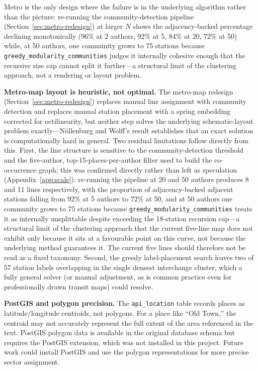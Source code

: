 \documentclass[logo,msc]{infthesis}
\begin{document}
Metro is the only design where the failure is in the underlying algorithm rather than the picture: re-running the community-detection pipeline (Section~\ref{sec:metro-redesign}) at larger $N$ shows the adjacency-backed percentage declining monotonically (96\% at 2 authors, 92\% at 5, 84\% at 20, 72\% at 50) while, at 50 authors, one community grows to 75 stations because \texttt{greedy\_modularity\_communities} judges it internally cohesive enough that the recursive size cap cannot split it further---a structural limit of the clustering approach, not a rendering or layout problem.
 
\textbf{Metro-map layout is heuristic, not optimal.} The metro-map redesign (Section~\ref{sec:metro-redesign}) replaces manual line assignment with community detection and replaces manual station placement with a spring embedding corrected for octilinearity, but neither step solves the underlying schematic-layout problem exactly---N{\"o}llenburg and Wolff's result \cite{nollenburg2006} establishes that an exact solution is computationally hard in general. Two residual limitations follow directly from this. First, the line structure is sensitive to the community-detection threshold and the five-author, top-15-places-per-author filter used to build the co-occurrence graph; this was confirmed directly rather than left as speculation (Appendix~\ref{app:scale}): re-running the pipeline at 20 and 50 authors produces 8 and 11 lines respectively, with the proportion of adjacency-backed adjacent stations falling from 92\% at 5 authors to 72\% at 50, and at 50 authors one community grows to 75 stations because \texttt{greedy\_modularity\_communities} treats it as internally unsplittable despite exceeding the 18-station recursion cap---a structural limit of the clustering approach that the current five-line map does not exhibit only because it sits at a favourable point on this curve, not because the underlying method guarantees it. The current five lines should therefore not be read as a fixed taxonomy. Second, the greedy label-placement search leaves two of 57 station labels overlapping in the single densest interchange cluster, which a fully general solver (or manual adjustment, as is common practice even for professionally drawn transit maps) could resolve.

\textbf{PostGIS and polygon precision.} The \texttt{api\_location} table records places as latitude/longitude centroids, not polygons. For a place like ``Old Town,'' the centroid may not accurately represent the full extent of the area referenced in the text. PostGIS polygon data is available in the original database schema but requires the PostGIS extension, which was not installed in this project. Future work could install PostGIS and use the polygon representations for more precise sector assignment.
 
\end{document}
